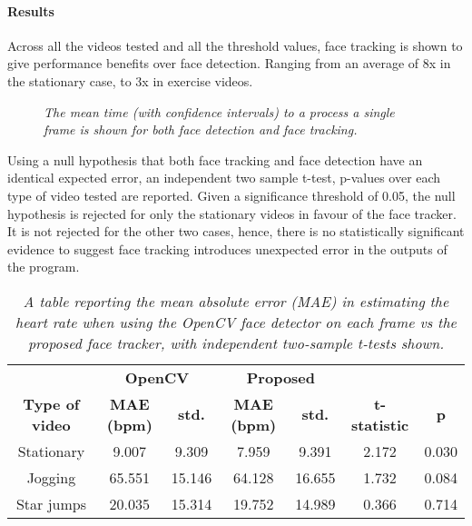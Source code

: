 \paragraph{Results}
Across all the videos tested and all the threshold values, face tracking is shown to give performance benefits over face detection.
Ranging from an average of 8x in the stationary case, to 3x in exercise videos.
\begin{figure}
    \centering
    \scalebox{0.8}{}
   \caption{\textit{The mean time (with confidence intervals) to a process a single frame is shown for both face detection and face tracking.}} 
\end{figure}
\noindent
Using a null hypothesis that both face tracking and face detection have an identical expected error, an independent two sample t-test, p-values over each type of video tested are reported.
Given a significance threshold of 0.05, the null hypothesis is rejected for only the stationary videos in favour of the face tracker.
It is not rejected for the other two cases, hence, there is no statistically significant evidence to suggest face tracking introduces unexpected error in the outputs of the program.
%     
\begin{table}
    \begin{tabular}{c|cc|cc|cc}
    \multicolumn{1}{l|}{} & \multicolumn{2}{c}{\textbf{OpenCV}} & \multicolumn{2}{c|}{\textbf{Proposed}} & \multicolumn{1}{l}{} & \multicolumn{1}{l}{} \\
    \textbf{Type of video} & \textbf{MAE (bpm)} & \textbf{std.} & \textbf{MAE (bpm)} & \textbf{std.} & \textbf{t-statistic} & \textbf{p} \\ \hline
    Stationary & 9.007 & 9.309 & 7.959 & 9.391 & 2.172 & 0.030 \\
    Jogging & 65.551 & 15.146 & 64.128 & 16.655 & 1.732 & 0.084 \\
    Star jumps & 20.035 & 15.314 & 19.752 & 14.989 & 0.366 & 0.714 \\ 
    \end{tabular}
    \caption{\textit{A table reporting the mean absolute error (MAE) in estimating the heart rate when using the OpenCV face detector on each frame vs the proposed face tracker, with independent two-sample t-tests shown. }}
    \end{table}

